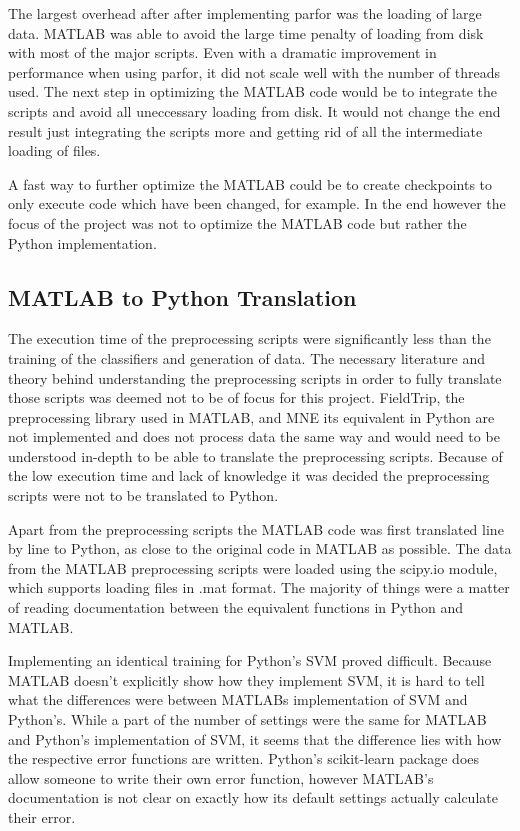 \documentclass[12pt, a4paper]{article}
\begin{document}
The largest overhead after after implementing parfor was the loading of large data. 
MATLAB was able to avoid the large time penalty of loading from disk with most of the major scripts.
Even with a dramatic improvement in performance when using parfor, it did not scale well with the number of threads used.
The next step in optimizing the MATLAB code would be to integrate the scripts and avoid all uneccessary loading from disk.
It would not change the end result just integrating the scripts more and getting rid of all the intermediate loading of files.

A fast way to further optimize the MATLAB could be to create checkpoints to only execute code which have been changed, for example.
In the end however the focus of the project was not to optimize the MATLAB code but rather the Python implementation.


\subsection{MATLAB to Python Translation}

The execution time of the preprocessing scripts were significantly less than the training of the classifiers and generation of data. 
The necessary literature and theory behind understanding the preprocessing scripts in order to fully translate those scripts was deemed not to be of focus for this project.
FieldTrip, the preprocessing library used in MATLAB, and MNE its equivalent in Python are not implemented and does not process data the same way and would need to be understood in-depth to be able to translate the preprocessing scripts.
Because of the low execution time and lack of knowledge it was decided the preprocessing scripts were not to be translated to Python.

Apart from the preprocessing scripts the MATLAB code was first translated line by line to Python, as close to the original code in MATLAB as possible.
The data from the MATLAB preprocessing scripts were loaded using the scipy.io module, which supports loading files in .mat format.
The majority of things were a matter of reading documentation between the equivalent functions in Python and MATLAB.

Implementing an identical training for Python's SVM proved difficult.
Because MATLAB doesn't explicitly show how they implement SVM, it is hard to tell what the differences were between MATLABs implementation of SVM and Python's.
While a part of the number of settings were the same for MATLAB and Python's implementation of SVM, it seems that the difference lies with how the respective error functions are written.
Python's scikit-learn package does allow someone to write their own error function, however MATLAB's documentation is not clear on exactly how its default settings actually calculate their error. %
\end{document}
